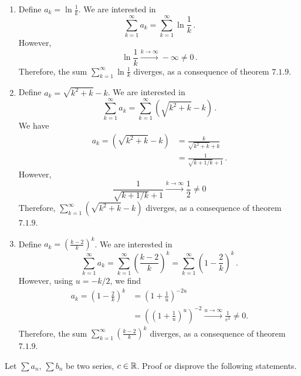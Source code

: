 \documentclass[week=5]{homework}
\begin{document}
\begin{questions}
\begin{enumerate}[label=(\alph*)]
	    	\item Define $a_k = \ln \frac{1}{k}$. We are interested in 
	    	\[
	    	\sum_{k=1}^{\infty} a_k = \sum_{k=1}^{\infty} \ln \frac{1}{k}\,.
	    	\] 
	    	However, 
	    	\[
	    	\ln \frac{1}{k} \xrightarrow{k\to\infty} -\infty \neq 0\,.
	    	\]
	    	Therefore, the sum $\sum_{k = 1}^{\infty} \ln \frac{1}{k}$ diverges, as a consequence of theorem $7.1.9$.
	    	
	    	\addtocounter{enumi}{1}
	    	\item Define $a_k = \sqrt{k^2 + k} -k$. We are interested in 
	    	\[
	    	\sum_{k=1}^{\infty} a_k = \sum_{k=1}^{\infty} \left(\sqrt{k^2 + k} -k\right)\,.
	    	\]
	    	We have
	    	\begin{align*}
	    	a_k = \left(\sqrt{k^2 + k} - k \right) &= \frac{k}{\sqrt{k^2 + k} + k } \\
	    	&= \frac{1}{\sqrt{k + 1/k} + 1}\,.
	    	\end{align*}
	    	However,
	    	\[
	    	\frac{1}{\sqrt{k + 1/k} + 1} \xrightarrow{k\to\infty} \frac{1}{2} \neq 0
	    	\]
	    	Therefore, $\sum_{k = 1}^{\infty} \left(\sqrt{k^2 + k} - k \right)$ diverges, as a consequence of theorem $7.1.9$.	       	
	    	
	    	\addtocounter{enumi}{2}
	    	\item Define $a_k = \left(\frac{k-2}{k}\right)^k$. We are interested in 
	    	\[
	    	\sum_{k=1}^{\infty} a_k = \sum_{k=1}^{\infty} \left(\frac{k-2}{k}\right)^k = \sum_{k = 1}^{\infty} \left(1 - \frac{2}{k} \right)^k\,.
	    	\]
	    	However, using $u = -k/2$, we find
	    	\begin{align*}
		    	a_k = \left(1 - \frac{2}{k} \right)^k &= \left(1 + \frac{1}{u} \right)^{-2u} \\
		    	&= \left(\left(1 + \frac{1}{u} \right)^u\right)^{-2} \xrightarrow{u\to\infty} \frac{1}{e^2} \neq 0.
	    	\end{align*}
	    	Therefore, the sum $\sum_{k = 1}^{\infty} \left(\frac{k - 2}{k} \right)^k$ diverges, as a consequence of theorem $7.1.9$.
	    	
	    \end{enumerate}
    
	    \question
	    Let $\sum a_n$, $\sum b_n$ be two series, $c\in\mathbb{R}$. Proof or disprove the following statements.
	    
\end{questions}
\end{document}
